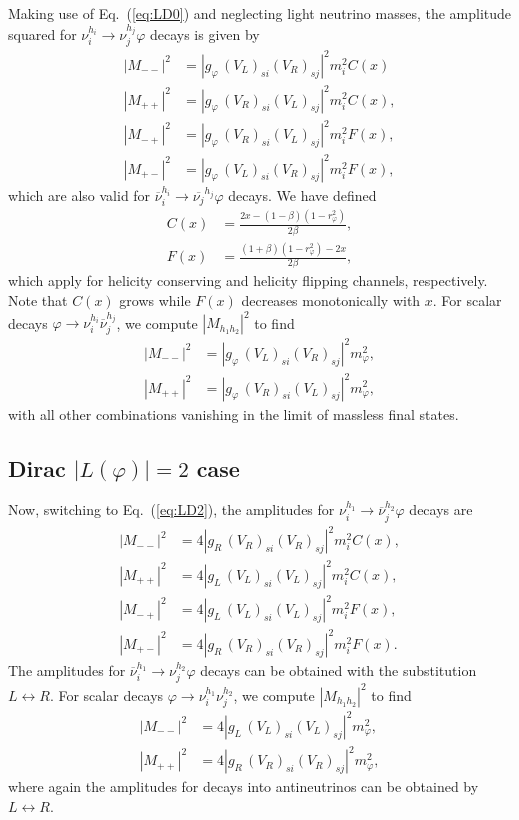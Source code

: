 \documentclass[
reprint,
superscriptaddress,
showpacs,
preprintnumbers,
nofootinbib,
nobibnotes,
amsmath,
amssymb, 
aps,
prd,
floatfix
]{revtex4-1}
\newcommand{\refeq}[1]{Eq.~(\ref{#1})}
\renewcommand{\phi}{\varphi}
\begin{document}
Making use of \refeq{eq:LD0} and neglecting light neutrino masses, the amplitude squared for $\nu_i^{h_i}\to\nu_j^{h_j} \phi$ decays is given by
\begin{align}
    |M_{--}|^2 &= |g_\phi\,(V_L)_{si} (V_R)_{sj}|^2 m_i^2 C(x)
    \\
    |M_{++}|^2 &= |g_\phi\,(V_R)_{si} (V_L)_{sj}|^2 m_i^2 C(x),
    \\
    |M_{-+}|^2 &= |g_\phi\,(V_R)_{si} (V_L)_{sj}|^2 m_i^2 F(x),
    \\
    |M_{+-}|^2 &= |g_\phi\,(V_L)_{si} (V_R)_{sj}|^2 m_i^2 F(x),
\end{align}
which are also valid for $\overline{\nu}_i^{h_i}\to\overline{\nu_j}^{h_j} \phi$ decays. We have defined
\begin{align}
    C(x) &=\frac{2 x - (1-\beta)(1-r_\phi^2)}{2\beta},\\
    F(x) &=\frac{(1+\beta)(1-r_\phi^2)-2x}{2\beta},
\end{align}
which apply for helicity conserving and helicity flipping channels, respectively. Note that $C(x)$ grows while $F(x)$ decreases monotonically with $x$.
For scalar decays $\phi \to \nu^{h_i}_i \overline{\nu}^{h_j}_j$, we compute $|M_{h_1 h_2}|^2$ to find
\begin{align}
    |M_{--}|^2 &= |g_\phi\,(V_L)_{si} (V_R)_{sj}|^2 m_\phi^2,
    \\
    |M_{++}|^2 &= |g_\phi\,(V_R)_{si} (V_L)_{sj}|^2 m_\phi^2,
\end{align}
with all other combinations vanishing in the limit of massless final states. 

\subsection{Dirac $|L(\phi)|=2$ case}

Now, switching to \refeq{eq:LD2}, the amplitudes for $\nu_i^{h_1}\to\overline{\nu}_j^{h_2} \phi$ decays are
\begin{align}
    |M_{--} |^2 &= 4|g_R \,(V_R)_{si} (V_R)_{sj}|^2 m_i^2 C(x),
    \\
    |M_{++}|^2 &= 4|g_L \,(V_L)_{si} (V_L)_{sj}|^2 m_i^2 C(x),
    \\
    |M_{-+} |^2 &= 4|g_L \,(V_L)_{si} (V_L)_{sj}|^2 m_i^2 F(x),
    \\
    |M_{+-}|^2 &= 4|g_R \,(V_R)_{si} (V_R)_{sj}|^2 m_i^2 F(x).
\end{align}
The amplitudes for $\overline{\nu}_i^{h_1}\to\nu_j^{h_2} \phi$ decays can be obtained with the substitution $L\leftrightarrow R$. For scalar decays $\phi \to \nu^{h_1}_i \nu^{h_2}_j$, we compute $|M_{h_1 h_2}|^2$ to find
\begin{align}
    |M_{--}|^2 &= 4 |g_L\,(V_L)_{si} (V_L)_{sj}|^2 m_\phi^2,
    \\
    |M_{++}|^2 &= 4 |g_R\,(V_R)_{si} (V_R)_{sj}|^2 m_\phi^2,
\end{align}
where again the amplitudes for decays into antineutrinos can be obtained by $L\leftrightarrow R$.
\end{document}
